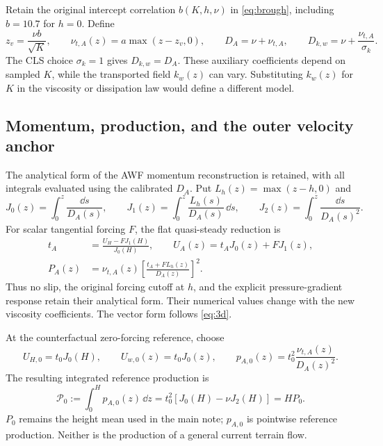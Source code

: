 Retain the original intercept correlation $b(K,h,\nu)$ in
\cref{eq:brough}, including $b=10.7$ for $h=0$. Define
\begin{equation}
 z_v=\frac{\nu b}{\sqrt K},\qquad
 \nu_{t,A}(z)=a\max(z-z_v,0),\qquad
 D_A=\nu+\nu_{t,A},\qquad
 D_{k,w}=\nu+\frac{\nu_{t,A}}{\sigma_k}.
 \label{eq:accepted-viscosities}
\end{equation}
The CLS choice $\sigma_k=1$ gives $D_{k,w}=D_A$.
These auxiliary coefficients depend on sampled $K$, while the
transported field $k_w(z)$ can vary. Substituting $k_w(z)$ for $K$
in the viscosity or dissipation law would define a different model.

\subsection{Momentum, production, and the outer velocity anchor}
\label{app:accepted-awf-momentum}

The analytical form of the AWF momentum reconstruction is retained,
with all integrals evaluated using the calibrated $D_A$. Put
$L_h(z)=\max(z-h,0)$ and
\begin{equation}
 J_0(z)=\int_0^z\frac{\dd s}{D_A(s)},\qquad
 J_1(z)=\int_0^z\frac{L_h(s)}{D_A(s)}\,\dd s,\qquad
 J_2(z)=\int_0^z\frac{\dd s}{D_A(s)^2}.
 \label{eq:accepted-J}
\end{equation}
For scalar tangential forcing $F$, the flat quasi-steady reduction is
\begin{equation}
 \begin{aligned}
 t_A&=\frac{U_H-FJ_1(H)}{J_0(H)},\qquad
 U_A(z)=t_AJ_0(z)+FJ_1(z),\\
 P_A(z)&=\nu_{t,A}(z)
       \left[\frac{t_A+FL_h(z)}{D_A(z)}\right]^2.
 \end{aligned}
 \label{eq:accepted-forced-awf}
\end{equation}
Thus no slip, the original forcing cutoff at $h$, and the explicit
pressure-gradient response retain their analytical form. Their
numerical values change with the new viscosity coefficients.
The vector form follows \cref{eq:3d}.

At the counterfactual zero-forcing reference, choose
\begin{equation}
 U_{H,0}=t_0J_0(H),\qquad
 U_{w,0}(z)=t_0J_0(z),\qquad
 p_{A,0}(z)=t_0^2\frac{\nu_{t,A}(z)}{D_A(z)^2}.
 \label{eq:accepted-reference-production}
\end{equation}
The resulting integrated reference production is
\begin{equation}
 \boxed{\mathcal P_0:=\int_0^H p_{A,0}(z)\,\dd z
 =t_0^2[J_0(H)-\nu J_2(H)]=HP_0.}
 \label{eq:accepted-production-budget}
\end{equation}
$P_0$ remains the height mean used in the main note; $p_{A,0}$ is
pointwise reference production. Neither is the production of a
general current terrain flow.

